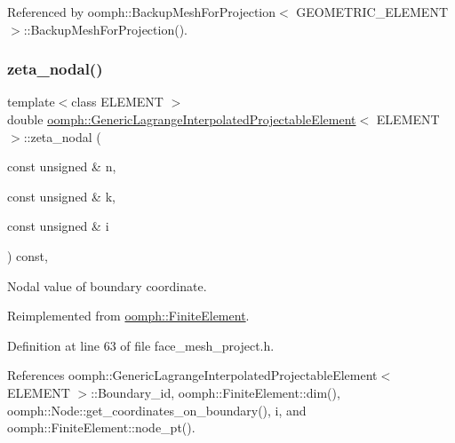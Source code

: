 Referenced by oomph\+::\+Backup\+Mesh\+For\+Projection$<$ G\+E\+O\+M\+E\+T\+R\+I\+C\+\_\+\+E\+L\+E\+M\+E\+N\+T $>$\+::\+Backup\+Mesh\+For\+Projection().

\mbox{\label{classoomph_1_1GenericLagrangeInterpolatedProjectableElement_a8168307c01e7d086dae283aa1c543226}} 
\subsubsection{\texorpdfstring{zeta\+\_\+nodal()}{zeta\_nodal()}}
{\footnotesize\ttfamily template$<$class E\+L\+E\+M\+E\+NT $>$ \\
double \hyperlink{classoomph_1_1GenericLagrangeInterpolatedProjectableElement}{oomph\+::\+Generic\+Lagrange\+Interpolated\+Projectable\+Element}$<$ E\+L\+E\+M\+E\+NT $>$\+::zeta\+\_\+nodal (\begin{DoxyParamCaption}\item[{const unsigned \&}]{n,  }\item[{const unsigned \&}]{k,  }\item[{const unsigned \&}]{i }\end{DoxyParamCaption}) const\hspace{0.3cm}{\ttfamily [inline]}, {\ttfamily [virtual]}}



Nodal value of boundary coordinate. 



Reimplemented from \hyperlink{classoomph_1_1FiniteElement_a849561c5fbcbc07dc49d2dc6cca68559}{oomph\+::\+Finite\+Element}.



Definition at line 63 of file face\+\_\+mesh\+\_\+project.\+h.



References oomph\+::\+Generic\+Lagrange\+Interpolated\+Projectable\+Element$<$ E\+L\+E\+M\+E\+N\+T $>$\+::\+Boundary\+\_\+id, oomph\+::\+Finite\+Element\+::dim(), oomph\+::\+Node\+::get\+\_\+coordinates\+\_\+on\+\_\+boundary(), i, and oomph\+::\+Finite\+Element\+::node\+\_\+pt().



